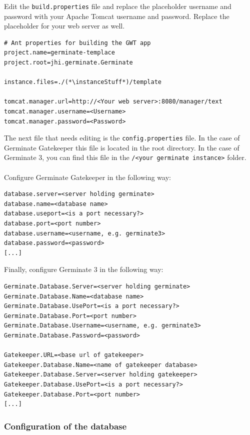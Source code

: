Edit the \texttt{build.properties} file and replace the placeholder username and password with your Apache Tomcat username and password. Replace the placeholder for your web server as well.
\begin{lstlisting}[style=EclipseProperties]
# Ant properties for building the GWT app
project.name=germinate-templace
project.root=jhi.germinate.Germinate

instance.files=./(*\instanceStuff*)/template

tomcat.manager.url=http://<Your web server>:8080/manager/text
tomcat.manager.username=<Username>
tomcat.manager.password=<Password>
\end{lstlisting}
\noindent
The next file that needs editing is the \texttt{config.properties} file. In the case of Germinate Gatekeeper this file is located in the root directory. In the case of Germinate 3, you can find this file in the \texttt{\instanceStuff/<your germinate instance>} folder.\\
\\
Configure Germinate Gatekeeper in the following way:

\begin{lstlisting}[style=Properties]
database.server=<server holding germinate>
database.name=<database name>
database.useport=<is a port necessary?>
database.port=<port number>
database.username=<username, e.g. germinate3>
database.password=<password>
[...]
\end{lstlisting}
\noindent
Finally, configure Germinate 3 in the following way:

\begin{lstlisting}[style=Properties]
Germinate.Database.Server=<server holding germinate>
Germinate.Database.Name=<database name>
Germinate.Database.UsePort=<is a port necessary?>
Germinate.Database.Port=<port number>
Germinate.Database.Username=<username, e.g. germinate3>
Germinate.Database.Password=<password>

Gatekeeper.URL=<base url of gatekeeper>
Gatekeeper.Database.Name=<name of gatekeeper database>
Gatekeeper.Database.Server=<server holding gatekeeper>
Gatekeeper.Database.UsePort=<is a port necessary?>
Gatekeeper.Database.Port=<port number>
[...]
\end{lstlisting}

\subsubsection{Configuration of the database}

